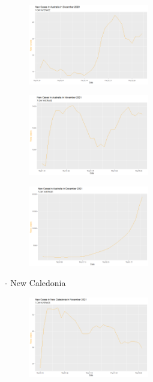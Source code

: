 \documentclass[a4paper]{article}
\theoremstyle{definition}
\begin{document}
\begin{enumerate}[i)]
\begin{enumerate}[1)]
		\begin{figure} [!htp]
  		\centering
  		\includegraphics [width=0.47\textwidth] {Images/aus_ncases_10}
		\end{figure}
		
		\begin{figure} [!htp]
  		\centering
  		\includegraphics [width=0.47\textwidth] {Images/aus_ncases_11}
		\end{figure}
		
		\begin{figure} [!htp]
  		\centering
  		\includegraphics [width=0.47\textwidth] {Images/aus_ncases_12}
		\end{figure}
	- New Caledonia\\
		\begin{figure} [!htp]
  		\centering
  		\includegraphics [width=0.47\textwidth] {Images/cal_ncases_3}
		\end{figure}
		

\end{enumerate}
\end{enumerate}
\end{document}
